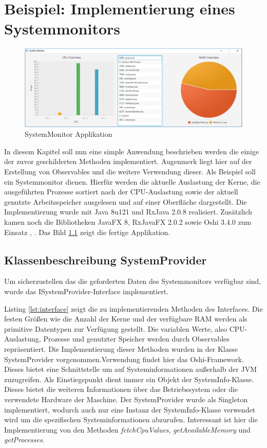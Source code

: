 \chapter{Beispiel: Implementierung eines Systemmonitors}\label{beispiel}
\begin{figure}[hbt]
	\centering
	\includegraphics[width=1\textwidth]{Abb/sysmon}
	\caption{SystemMonitor Applikation}
	\label{pic:sysmon}
\end{figure}
In diesem Kapitel soll nun eine simple Anwendung beschrieben werden die einige der zuvor geschilderten Methoden implementiert. Augenmerk liegt hier auf der Erstellung von Observables und die weitere Verwendung dieser. Als Beispiel soll ein Systemmonitor dienen. Hierfür werden die aktuelle Auslastung der Kerne, die ausgeführten Prozesse sortiert nach der CPU-Auslastung sowie der aktuell genutzte Arbeitsspeicher ausgelesen und auf einer Oberfläche dargestellt. Die Implementierung wurde mit Java 8u121 und RxJava 2.0.8 realisiert. Zusätzlich kamen noch die Bibliotheken JavaFX 8, RxJavaFX 2.0.2 sowie Oshi 3.4.0 zum Einsatz \cite{rxajavafx}, \cite{oshi}. Das Bild \ref{pic:sysmon} zeigt die fertige Applikation.
\section{Klassenbeschreibung SystemProvider}
Um sicherzustellen das die geforderten Daten des Systemmonitors verfügbar sind, wurde das ISystemProvider-Interface implementiert. 
 
Listing \ref{lst:interface} zeigt die zu implementierenden Methoden des Interfaces. Die festen Größen wie die Anzahl der Kerne und der verfügbare RAM werden als primitive Datentypen zur Verfügung gestellt. Die variablen Werte, also CPU-Auslastung, Prozesse und genutzter Speicher werden durch Observables repräsentiert. Die Implementierung dieser Methoden wurden in der Klasse SystemProvider vorgenommen.Verwendung findet hier das Oshi-Framework. Dieses bietet eine Schnittstelle um auf Systeminformationen außerhalb der JVM zuzugreifen. Als Einstiegspunkt dient immer ein Objekt der SystemInfo-Klasse. Dieses bietet die weiteren Informationen über das Betriebssystem oder die verwendete Hardware der Maschine. Der SystemProvider wurde als Singleton implementiert, wodurch auch nur eine Instanz der SystemInfo-Klasse verwendet wird um die spezifischen Systeminformationen abzurufen. Interessant ist hier die Implementierung von den Methoden \textit{fetchCpuValues}, \textit{getAvailableMemory} und \textit{getProcesses}. 
